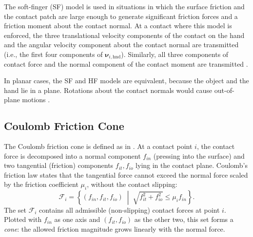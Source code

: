The soft-finger (SF) model is used in situations in which the surface
friction and the contact patch are large enough to generate significant
friction forces and a friction moment about the contact normal. At a contact
where this model is enforced, the three translational velocity components of
the contact on the hand and the angular velocity component about the contact
normal are transmitted (i.e., the first four components of
$\boldsymbol{\nu}_{i,\mathrm{hnd}}$). Similarly, all three components of
contact force and the normal component of the contact moment are transmitted
\cite[p.~675]{prattichizzo2008grasping}.

In planar cases, the SF and HF models are equivalent, because the object and
the hand lie in a plane. Rotations about the contact normals would cause
out-of-plane motions \cite[p.~676]{prattichizzo2008grasping}.

\subsection{Coulomb Friction Cone}
\label{sec:friction-cone}

The Coulomb friction cone is defined as in \cite{prattichizzo2008grasping}.
At a contact point $i$, the contact force is decomposed into a normal
component $f_{in}$ (pressing into the surface) and two tangential (friction)
components $f_{it}, f_{io}$ lying in the contact plane. Coulomb's friction
law states that the tangential force cannot exceed the normal force scaled by
the friction coefficient $\mu_i$, without the contact slipping:
\begin{equation}
    \mathcal{F}_i = \left\{ (f_{in}, f_{it}, f_{io}) \;\middle|\; \sqrt{f_{it}^2 + f_{io}^2} \le \mu_i f_{in} \right\}.
    \label{eq:friction-cone-explicit}
\end{equation}
The set $\mathcal{F}_i$ contains all admissible (non-slipping) contact forces
at point $i$. Plotted with $f_{in}$ as one axis and $(f_{it}, f_{io})$ as the
other two, this set forms a \emph{cone}: the allowed friction magnitude grows
linearly with the normal force.

